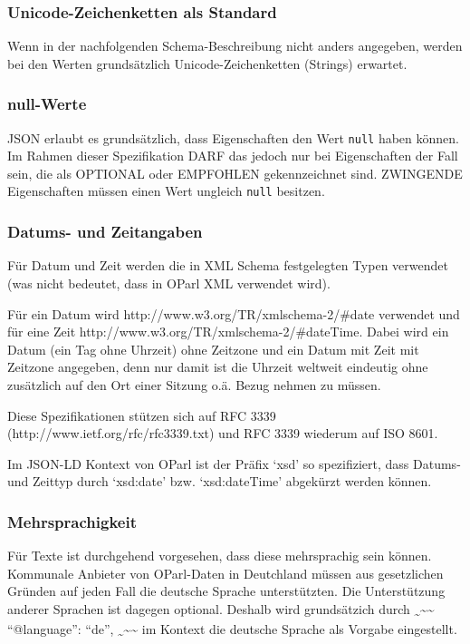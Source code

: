 \documentclass[,a4paper]{article}
\begin{document}
\subsubsection{Unicode-Zeichenketten als
Standard}\label{unicode-zeichenketten-als-standard}

Wenn in der nachfolgenden Schema-Beschreibung nicht anders angegeben,
werden bei den Werten grundsätzlich Unicode-Zeichenketten (Strings)
erwartet.

\subsubsection{null-Werte}\label{null-werte}

JSON erlaubt es grundsätzlich, dass Eigenschaften den Wert \texttt{null}
haben können. Im Rahmen dieser Spezifikation DARF das jedoch nur bei
Eigenschaften der Fall sein, die als OPTIONAL oder EMPFOHLEN
gekennzeichnet sind. ZWINGENDE Eigenschaften müssen einen Wert ungleich
\texttt{null} besitzen.

\subsubsection{Datums- und Zeitangaben}\label{datums--und-zeitangaben}

Für Datum und Zeit werden die in XML Schema festgelegten Typen verwendet
(was nicht bedeutet, dass in OParl XML verwendet wird).

Für ein Datum wird http://www.w3.org/TR/xmlschema-2/\#date verwendet und
für eine Zeit http://www.w3.org/TR/xmlschema-2/\#dateTime. Dabei wird
ein Datum (ein Tag ohne Uhrzeit) ohne Zeitzone und ein Datum mit Zeit
mit Zeitzone angegeben, denn nur damit ist die Uhrzeit weltweit
eindeutig ohne zusätzlich auf den Ort einer Sitzung o.ä. Bezug nehmen zu
müssen.

Diese Spezifikationen stützen sich auf RFC 3339
(http://www.ietf.org/rfc/rfc3339.txt) und RFC 3339 wiederum auf ISO
8601.

Im JSON-LD Kontext von OParl ist der Präfix `xsd' so spezifiziert, dass
Datums- und Zeittyp durch `xsd:date' bzw. `xsd:dateTime' abgekürzt
werden können.

\subsubsection{Mehrsprachigkeit}\label{mehrsprachigkeit}

Für Texte ist durchgehend vorgesehen, dass diese mehrsprachig sein
können. Kommunale Anbieter von OParl-Daten in Deutchland müssen aus
gesetzlichen Gründen auf jeden Fall die deutsche Sprache unterstützten.
Die Unterstützung anderer Sprachen ist dagegen optional. Deshalb wird
grundsätzich durch
\textsubscript{\textasciitilde{}}\textasciitilde{}\textasciitilde{}
``@language'': ``de'',
\textsubscript{\textasciitilde{}}\textasciitilde{}\textasciitilde{} im
Kontext die deutsche Sprache als Vorgabe eingestellt.
\end{document}
